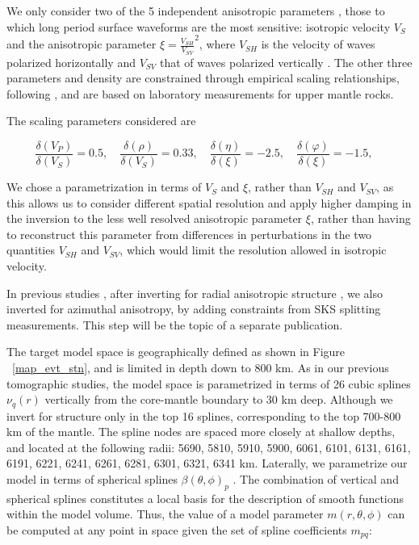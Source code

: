 \documentclass[12pt]{article}
\begin{document}
We only consider two of the 5 independent anisotropic parameters , those to which long period surface waveforms are the most sensitive: isotropic velocity $V_{S}$ and the anisotropic parameter $\xi = {\frac{V_{SH}}{V_{SV}}}^2$, where $V_{SH}$ is the velocity of waves polarized horizontally and $V_{SV}$ that of waves polarized vertically . 
The other three parameters and density are constrained through empirical scaling relationships, following \cite{montagner1989petrological}, and are based on laboratory measurements for upper mantle rocks. 

The scaling parameters considered are \citep{montagner1989petrological}

 \begin{equation}
\frac{\delta(V_{P})}{\delta(V_{S})} = 0.5, \quad
\frac{\delta(\rho)}{\delta(V_{S})} = 0.33, \quad
\frac{\delta(\eta)}{\delta(\xi)} = -2.5,   \quad
\frac{\delta(\varphi)}{\delta(\xi)} = -1.5,   \quad
\end{equation}

We chose a parametrization in terms of $V_S$ and $\xi$, rather than $V_{SH}$ and $V_{SV}$, as this allows us to consider different spatial resolution and apply higher damping in the inversion to the less well resolved anisotropic parameter $\xi$, rather than having to reconstruct this parameter from differences in perturbations in the two quantities $V_{SH}$ and $V_{SV}$, which would limit the resolution allowed in isotropic velocity.

In previous studies \citep{marone2007depth,yuan2010lithospheric}, after inverting for radial anisotropic structure \citep{marone2007three,yuan20113}, we also inverted for azimuthal anisotropy, by adding constraints from SKS splitting measurements. This step will be the topic of a separate publication.  

The target model space is geographically defined as shown in Figure ~\ref{map_evt_stn}, and is limited in depth down to 800 km. 
As in our previous tomographic studies, the model space is parametrized in terms of 26 cubic splines $\nu_{q}(r)$ vertically \citep{megnin2000three} from the core-mantle boundary to 30 km deep. 
Although we invert for structure only in the top 16 splines, corresponding to the top 700-800 km of the mantle. 
The spline nodes are spaced more closely at shallow depths, and located at the following radii: 5690, 5810, 5910, 5900, 6061, 6101, 6131, 6161, 6191, 6221, 6241, 6261, 6281, 6301, 6321, 6341 km.  
Laterally, we parametrize our model in terms of spherical splines $\beta(\theta,\phi)_{p}$ \citep{wang1995spherical}. 
The combination of vertical and spherical splines constitutes a local basis for the description of smooth functions within the model volume. 
Thus, the value of a model parameter $m(r,\theta,\phi)$ can be computed at any point in space given the set of spline coefficients $m_{pq}$:
\end{document}
